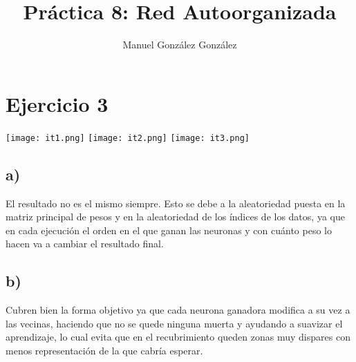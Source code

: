 \documentclass[12pt,a4paper]{article}
\author{Manuel González González}
\title{Práctica 8: Red Autoorganizada}
\begin{document}
\maketitle

\section*{Ejercicio 3}

\texttt{[image: it1.png]}
\texttt{[image: it2.png]}
\texttt{[image: it3.png]}

\subsection*{a)}

El resultado no es el mismo siempre. Esto se debe a la aleatoriedad puesta en la matriz principal de pesos y en la aleatoriedad de los índices de los datos, ya que en cada ejecución el orden en el que ganan las neuronas y con cuánto peso lo hacen va a cambiar el resultado final.


\subsection*{b)}

Cubren bien la forma objetivo ya que cada neurona ganadora modifica a su vez a las vecinas, haciendo que no se quede ninguna muerta y ayudando a suavizar el aprendizaje, lo cual evita que en el recubrimiento queden zonas muy dispares con menos representación de la que cabría esperar.
\end{document}
